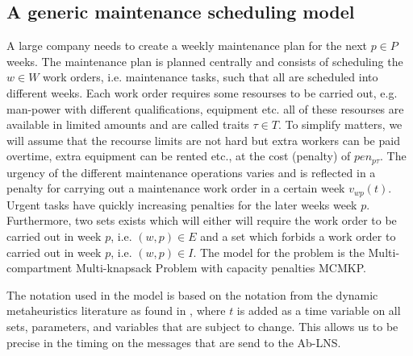 \subsection{A generic maintenance scheduling model}
\label{sub2sec2}
A large company needs to create a weekly maintenance plan for the next $p \in P$ weeks. The maintenance plan is planned centrally and consists of scheduling the $w \in W$ work orders, i.e. maintenance tasks, such that all are scheduled into different weeks. Each work order requires some resourses to be carried out, e.g. man-power with different qualifications, equipment etc. all of these resourses are available in limited amounts and are called traits $\tau \in T$. To simplify matters, we will assume that the recourse limits are not hard but extra workers can be paid overtime, extra equipment can be rented etc., at the cost (penalty) of $pen_{p\tau}$. The urgency of the different maintenance operations varies and is reflected in a penalty for carrying out a maintenance work order in a certain week $v_{wp}(t)$. Urgent tasks have quickly increasing penalties for the later weeks week $p$. Furthermore, two sets exists which will either will require the work order to be carried out in week $p$, i.e. $(w,p) \in E$ and a set which forbids a work order to carried out in week $p$, i.e. $(w,p) \in I$. The model for the problem is the Multi-compartment Multi-knapsack Problem with capacity penalties MCMKP.

The notation used in the model is based on the notation from the dynamic metaheuristics literature as found in \cite{yangMetaheuristicsDynamicCombinatorial2013}, where $t$ is added as a time variable on all sets, parameters, and variables that are subject to change.
This allows us to be precise in the timing on the messages that are send to the Ab-LNS.  

